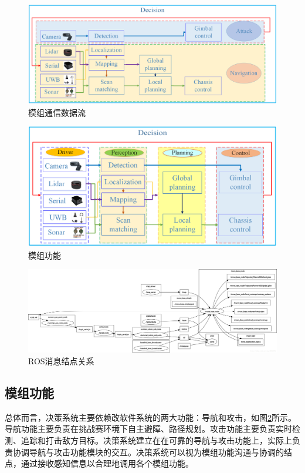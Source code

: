 \begin{figure}[htb]
  \centering
  \includegraphics[width=\textwidth]{figures/dataflow.png}
  \caption{模组通信数据流}\label{dataflow}
\end{figure}

\begin{figure}[htb]
  \centering
  \includegraphics[width=\textwidth]{figures/function.png}
  \caption{模组功能}\label{function}
\end{figure}

\begin{figure}[htb]
  \centering
  \includegraphics[width=\textwidth]{figures/topic.png}
  \caption{ROS消息结点关系}\label{topic}
\end{figure}

\subsection{模组功能}
总体而言，决策系统主要依赖改软件系统的两大功能：导航和攻击，如图\ref{function}所示。导航功能主要负责在挑战赛环境下自主避障、路径规划。攻击功能主要负责实时检测、追踪和打击敌方目标。决策系统建立在在可靠的导航与攻击功能上，实际上负责协调导航与攻击功能模块的交互。决策系统可以视为模组功能沟通与协调的结点，通过接收感知信息以合理地调用各个模组功能。


